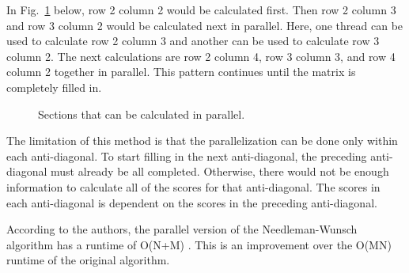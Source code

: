 \documentclass[conference]{IEEEtran}
\begin{document}
In Fig.~\ref{8} below, row 2 column 2 would be calculated first. Then row 2 column 3 and row 3 column 2 would be calculated next in parallel. Here, one thread can be used to calculate row 2 column 3 and another can be used to calculate row 3 column 2. The next calculations are row 2 column 4, row 3 column 3, and row 4 column 2 together in parallel. This pattern continues until the matrix is completely filled in.

\begin{figure}[htbp]
\centerline{}
\caption{Sections that can be calculated in parallel. \cite{naveed_siddiqui_ahmed}}
\label{8}
\end{figure}

The limitation of this method is that the parallelization can be done only within each anti-diagonal. To start filling in the next anti-diagonal, the preceding anti-diagonal must already be all completed. Otherwise, there would not be enough information to calculate all of the scores for that anti-diagonal. The scores in each anti-diagonal is dependent on the scores in the preceding anti-diagonal.

According to the authors, the parallel version of the Needleman-Wunsch algorithm has a runtime of O(N+M) \cite{naveed_siddiqui_ahmed}. This is an improvement over the O(MN) runtime of the original algorithm.
\end{document}
